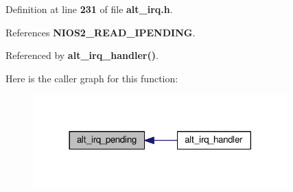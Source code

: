 Definition at line {\bf 231} of file {\bf alt\+\_\+irq.\+h}.



References {\bf N\+I\+O\+S2\+\_\+\+R\+E\+A\+D\+\_\+\+I\+P\+E\+N\+D\+I\+NG}.



Referenced by {\bf alt\+\_\+irq\+\_\+handler()}.



Here is the caller graph for this function\+:
\nopagebreak
\begin{figure}[H]
\begin{center}
\leavevmode
\includegraphics[width=278pt]{dc/dc9/alt__irq_8h_a1e568aff96ac0760fc059347e9c8faa6_icgraph}
\end{center}
\end{figure}


